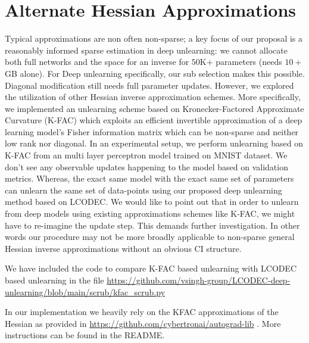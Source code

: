 \section{Alternate Hessian Approximations}

Typical approximations are non often non-sparse; a key focus of our proposal is a reasonably informed sparse estimation in deep unlearning: we cannot allocate both full networks and the space for an inverse for $50$K$+$ parameters (needs $10+$GB alone). For Deep unlearning specifically, our sub selection makes this possible. Diagonal modification still needs full parameter updates. However, we explored the utilization of other Hessian inverse approximation schemes. More specifically, we implemented an unlearning scheme based on Kronecker-Factored Approximate Curvature (K-FAC) \cite{martens2015optimizing} which exploits an efficient invertible approximation of a deep learning model's Fisher information matrix which can be non-sparse and neither low rank nor diagonal. In an experimental setup, we perform unlearning based on K-FAC from an multi layer perceptron model trained on MNIST dataset. We don't see any observable updates happening to the model based on validation metrics. Whereas, the exact same model with the exact same set of parameters can unlearn the same set of data-points using our proposed deep unlearning method based on LCODEC. We would like to point out that in order to unlearn from deep models using existing approximations schemes like K-FAC, we might have to re-imagine the update step. This demands further investigation. In other words our procedure may not be more broadly applicable to non-sparse general Hessian inverse approximations without an obvious CI structure.

We have included the code to compare K-FAC based unlearning with LCODEC based unlearning in the file \url{https://github.com/vsingh-group/LCODEC-deep-unlearning/blob/main/scrub/kfac\_scrub.py}

In our implementation we heavily rely on the KFAC approximations of the Hessian as provided in \url{https://github.com/cybertronai/autograd-lib} . More instructions can be found in the README.